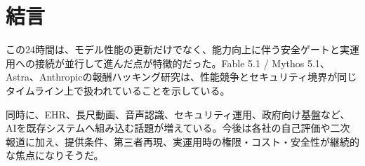 \section*{結言}
この24時間は、モデル性能の更新だけでなく、能力向上に伴う安全ゲートと実運用への接続が並行して進んだ点が特徴的だった。Fable 5.1 / Mythos 5.1、Astra、Anthropicの報酬ハッキング研究は、性能競争とセキュリティ境界が同じタイムライン上で扱われていることを示している。

同時に、EHR、長尺動画、音声認識、セキュリティ運用、政府向け基盤など、AIを既存システムへ組み込む話題が増えている。今後は各社の自己評価や二次報道に加え、提供条件、第三者再現、実運用時の権限・コスト・安全性が継続的な焦点になりそうだ。
